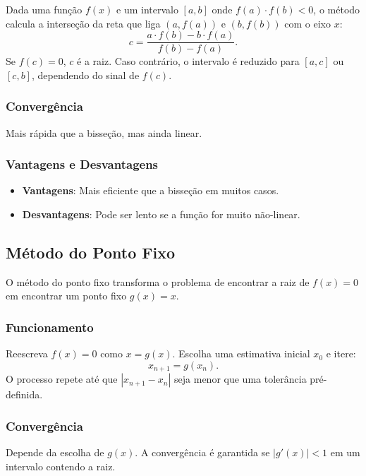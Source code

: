 Dada uma função \( f(x) \) e um intervalo \([a, b]\) onde \( f(a) \cdot f(b) < 0
\), o método calcula a interseção da reta que liga \( (a, f(a)) \) e \( (b,
f(b)) \) com o eixo \( x \):
\[
	c = \frac{a \cdot f(b) - b \cdot f(a)}{f(b) - f(a)}.
\]
Se \( f(c) = 0 \), \( c \) é a raiz. Caso contrário, o intervalo é reduzido para
\([a, c]\) ou \([c, b]\), dependendo do sinal de \( f(c) \).

\subsubsection{Convergência}

Mais rápida que a bisseção, mas ainda linear.

\subsubsection{Vantagens e Desvantagens}

\begin{itemize}
	\item \textbf{Vantagens}: Mais eficiente que a bisseção em muitos casos.
	\item \textbf{Desvantagens}: Pode ser lento se a função for muito
	      não-linear.
\end{itemize}

\subsection{\textbf{Método do Ponto Fixo}}

O método do ponto fixo transforma o problema de encontrar a raiz de \( f(x) = 0
\) em encontrar um ponto fixo \( g(x) = x \).\cite{moreira2011curso}

\subsubsection{Funcionamento}

Reescreva \( f(x) = 0 \) como \( x = g(x) \). Escolha uma estimativa inicial \(
x_0 \) e itere:
\[
	x_{n+1} = g(x_n).
\]
O processo repete até que \( |x_{n+1} - x_n| \) seja menor que uma tolerância
pré-definida.

\subsubsection{Convergência}

Depende da escolha de \( g(x) \). A convergência é garantida se \( |g'(x)| < 1
\) em um intervalo contendo a raiz.

